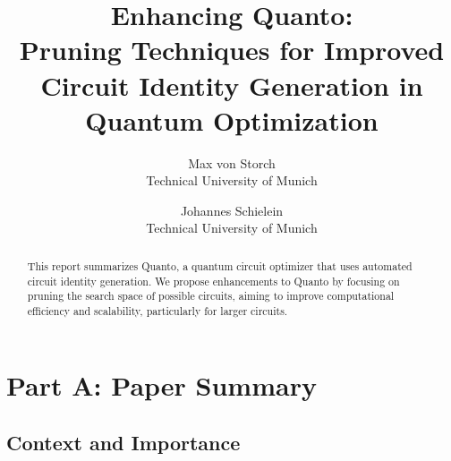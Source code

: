 \renewcommand\theadalign{bc}
\renewcommand\theadfont{\bfseries}

\usepackage{filecontents}





\title{\Large \bf Enhancing Quanto:\\Pruning Techniques for Improved Circuit Identity Generation in Quantum Optimization}

\author{
{\rm Max von Storch}\\
Technical University of Munich
\and
{\rm Johannes Schielein}\\
Technical University of Munich
} %

\maketitle

\begin{abstract}
This report summarizes Quanto, a quantum circuit optimizer that uses automated circuit identity generation. We propose enhancements to Quanto by focusing on pruning the search space of possible circuits, aiming to improve computational efficiency and scalability, particularly for larger circuits.  
\end{abstract}


\section{Part A: Paper Summary}

\subsection{Context and Importance}

